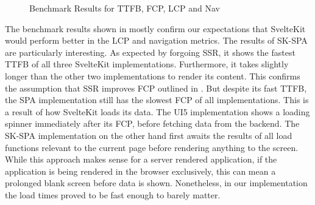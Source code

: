 \begin{figure}
    \centering
    \caption{Benchmark Results for TTFB, FCP, LCP and Nav}
    \label{fig:benchmark}
\end{figure}

The benchmark results shown in  mostly confirm our expectations that SvelteKit would perform better in the LCP and navigation metrics. The results of SK-SPA are particularly interesting. As expected by forgoing SSR, it shows the fastest TTFB of all three SvelteKit implementations. Furthermore, it takes slightly longer than the other two implementations to render its content. This confirms the assumption that SSR improves FCP outlined in . But despite its fast TTFB, the SPA implementation still has the slowest FCP of all implementations. This is a result of how SvelteKit loads its data. The UI5 implementation shows a loading spinner immediately after its FCP, before fetching data from the backend. The SK-SPA implementation on the other hand first awaits the results of all load functions relevant to the current page before rendering anything to the screen. While this approach makes sense for a server rendered application, if the application is being rendered in the browser exclusively, this can mean a prolonged blank screen before data is shown. Nonetheless, in our implementation the load times proved to be fast enough to barely matter. 

